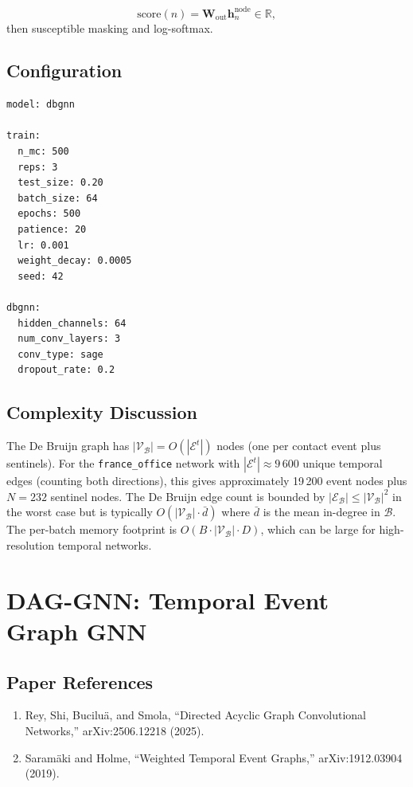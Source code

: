 \documentclass[12pt,a4paper]{report}
\newcommand{\R}{\mathbb{R}}
\newcommand{\bh}{\mathbf{h}}
\newcommand{\bW}{\mathbf{W}}
\newcommand{\calV}{\mathcal{V}}
\newcommand{\calE}{\mathcal{E}}
\newcommand{\calB}{\mathcal{B}}
\begin{document}
\begin{equation}
  \text{score}(n) = \bW_{\text{out}} \bh_n^{\text{node}} \in \R,
\end{equation}
then susceptible masking and log-softmax.

\section{Configuration}

\begin{lstlisting}[language=bash,caption={DBGNN config (\texttt{exp/france\_office/dbgnn.yml}).}]
model: dbgnn

train:
  n_mc: 500
  reps: 3
  test_size: 0.20
  batch_size: 64
  epochs: 500
  patience: 20
  lr: 0.001
  weight_decay: 0.0005
  seed: 42

dbgnn:
  hidden_channels: 64
  num_conv_layers: 3
  conv_type: sage
  dropout_rate: 0.2
\end{lstlisting}

\section{Complexity Discussion}

The De Bruijn graph has $|\calV_\calB| = O(|\calE^t|)$ nodes (one per contact
event plus sentinels). For the \texttt{france\_office} network with
$|\calE^t| \approx 9\,600$ unique temporal edges (counting both directions), this
gives approximately 19\,200 event nodes plus $N = 232$ sentinel nodes. The De
Bruijn edge count is bounded by $|\calE_\calB| \leq |\calV_\calB|^2$ in the
worst case but is typically $O(|\calV_\calB| \cdot \bar{d})$ where $\bar{d}$ is
the mean in-degree in $\calB$. The per-batch memory footprint is $O(B \cdot
|\calV_\calB| \cdot D)$, which can be large for high-resolution temporal networks.

\chapter{DAG-GNN: Temporal Event Graph GNN}
\label{chap:dag_gnn}

\section{Paper References}

\begin{enumerate}
  \item Rey, Shi, Buciluä, and Smola, ``Directed Acyclic Graph Convolutional
    Networks,'' arXiv:2506.12218 (2025).
  \item Saramäki and Holme, ``Weighted Temporal Event Graphs,''
    arXiv:1912.03904 (2019).
\end{enumerate}
\end{document}
